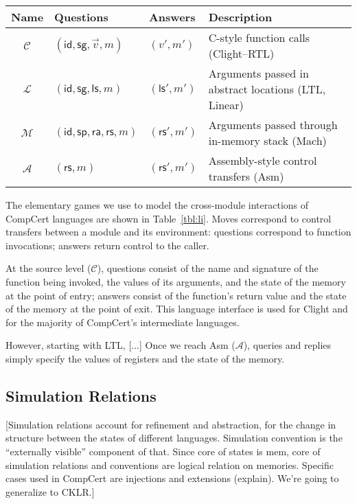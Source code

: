 \documentclass[acmsmall,timestamp,review]{acmart}
\newcommand{\kw}[1]{\ensuremath{ \mathsf{#1} }}
\begin{document}
\begin{table*} %
  \begin{tabular}{clll}
    \hline
    Name & Questions & Answers & Description \\
    \hline
    $\mathcal{C}$ & $(\kw{id}, \kw{sg}, \vec{v}, m)$ & $(v', m')$ &
      C-style function calls (Clight--RTL) \\
    $\mathcal{L}$ & $(\kw{id}, \kw{sg}, \kw{ls}, m)$ & $(\kw{ls}', m')$ &
      Arguments passed in abstract locations (LTL, Linear) \\
    $\mathcal{M}$ & $(\kw{id}, \kw{sp},\kw{ra},\kw{rs}, m)$ & $(\kw{rs}', m')$ &
      Arguments passed through in-memory stack (Mach) \\
    $\mathcal{A}$ & $(\kw{rs}, m)$ & $(\kw{rs}', m')$ &
      Assembly-style control transfers (Asm) \\
    \hline
  \end{tabular}
  \caption{Language interfaces for the various languages of CompCert.}
  \label{tbl:li}
\end{table*}

The elementary games we use to model
the cross-module interactions of CompCert languages
are shown in Table~\ref{tbl:li}.
Moves correspond to control transfers
between a module and its environment:
questions correspond to function invocations;
answers return control to the caller.

At the source level ($\mathcal{C}$),
questions consist of
the name and signature of the function being invoked,
the values of its arguments,
and the state of the memory at the point of entry;
answers
consist of the function's return value
and the state of the memory at the point of exit.
This language interface is used for Clight and
for the majority of CompCert's intermediate languages.

However, starting with LTL, [...]
Once we reach Asm ($\mathcal{A}$),
queries and replies simply specify
the values of registers and the state of the memory.


\subsection{Simulation Relations} %

[Simulation relations account for refinement and abstraction,
for the change in structure between the states of different languages.
Simulation convention is the ``externally visible'' component of that.
Since core of states is mem,
core of simulation relations and conventions
are logical relation on memories.
Specific cases used in CompCert are
injections and extensions (explain).
We're going to generalize to CKLR.]
\end{document}
